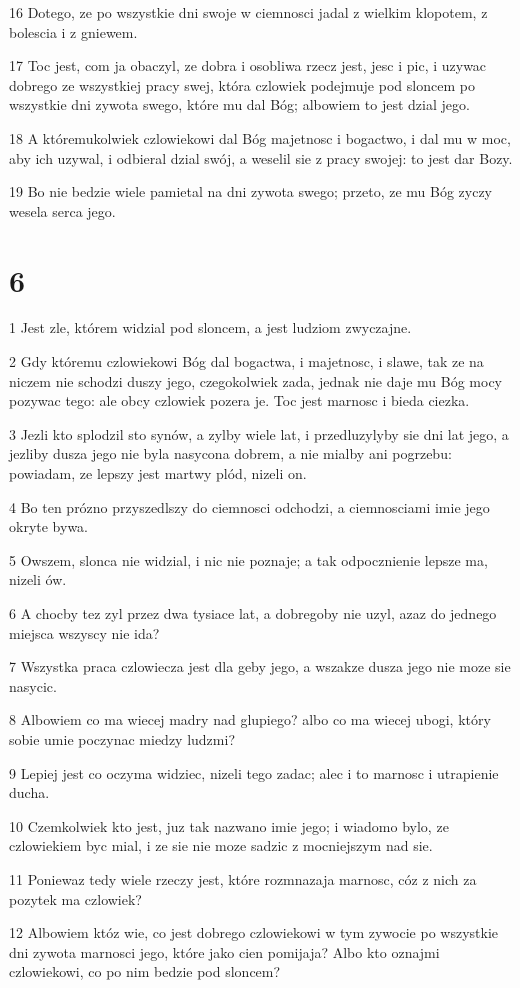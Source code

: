 \par 16 Dotego, ze po wszystkie dni swoje w ciemnosci jadal z wielkim klopotem, z bolescia i z gniewem.
\par 17 Toc jest, com ja obaczyl, ze dobra i osobliwa rzecz jest, jesc i pic, i uzywac dobrego ze wszystkiej pracy swej, która czlowiek podejmuje pod sloncem po wszystkie dni zywota swego, które mu dal Bóg; albowiem to jest dzial jego.
\par 18 A któremukolwiek czlowiekowi dal Bóg majetnosc i bogactwo, i dal mu w moc, aby ich uzywal, i odbieral dzial swój, a weselil sie z pracy swojej: to jest dar Bozy.
\par 19 Bo nie bedzie wiele pamietal na dni zywota swego; przeto, ze mu Bóg zyczy wesela serca jego.

\chapter{6}

\par 1 Jest zle, którem widzial pod sloncem, a jest ludziom zwyczajne.
\par 2 Gdy któremu czlowiekowi Bóg dal bogactwa, i majetnosc, i slawe, tak ze na niczem nie schodzi duszy jego, czegokolwiek zada, jednak nie daje mu Bóg mocy pozywac tego: ale obcy czlowiek pozera je. Toc jest marnosc i bieda ciezka.
\par 3 Jezli kto splodzil sto synów, a zylby wiele lat, i przedluzylyby sie dni lat jego, a jezliby dusza jego nie byla nasycona dobrem, a nie mialby ani pogrzebu: powiadam, ze lepszy jest martwy plód, nizeli on.
\par 4 Bo ten prózno przyszedlszy do ciemnosci odchodzi, a ciemnosciami imie jego okryte bywa.
\par 5 Owszem, slonca nie widzial, i nic nie poznaje; a tak odpocznienie lepsze ma, nizeli ów.
\par 6 A chocby tez zyl przez dwa tysiace lat, a dobregoby nie uzyl, azaz do jednego miejsca wszyscy nie ida?
\par 7 Wszystka praca czlowiecza jest dla geby jego, a wszakze dusza jego nie moze sie nasycic.
\par 8 Albowiem co ma wiecej madry nad glupiego? albo co ma wiecej ubogi, który sobie umie poczynac miedzy ludzmi?
\par 9 Lepiej jest co oczyma widziec, nizeli tego zadac; alec i to marnosc i utrapienie ducha.
\par 10 Czemkolwiek kto jest, juz tak nazwano imie jego; i wiadomo bylo, ze czlowiekiem byc mial, i ze sie nie moze sadzic z mocniejszym nad sie.
\par 11 Poniewaz tedy wiele rzeczy jest, które rozmnazaja marnosc, cóz z nich za pozytek ma czlowiek?
\par 12 Albowiem któz wie, co jest dobrego czlowiekowi w tym zywocie po wszystkie dni zywota marnosci jego, które jako cien pomijaja? Albo kto oznajmi czlowiekowi, co po nim bedzie pod sloncem?

